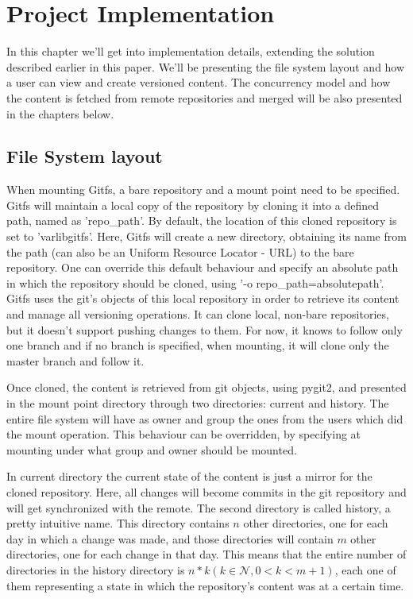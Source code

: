 \chapter{Project Implementation}

\label{ch:fslayout}

In this chapter we'll get into implementation details, extending the solution described earlier in this paper. We'll be presenting the file system layout and how a user can view and create versioned content. The concurrency model and how the content is fetched from remote repositories and merged will be also presented in the chapters below.

\section{File System layout}
When mounting Gitfs, a bare repository and a mount point need to be specified. Gitfs will maintain a local copy of the repository by cloning it into a defined path, named as 'repo\_path'. By default, the location of this cloned repository is set to '\/var\/lib\/gitfs'. Here, Gitfs will create a new directory, obtaining its name from the path (can also be an Uniform Resource Locator - URL) to the bare repository. One can override this default behaviour and specify an absolute path in which the repository should be cloned, using '-o repo\_path=\/absolute\/path\/'. Gitfs uses the git's objects of this local repository in order to retrieve its content and manage all versioning operations. It can clone local, non-bare repositories, but it doesn't support pushing changes to them. For now, it knows to follow only one branch and if no branch is specified, when mounting, it will clone only the master branch and follow it.

Once cloned, the content is retrieved from git objects, using pygit2, and presented in the mount point directory through two directories: current and history. The entire file system will have as owner and group the ones from the users which did the mount operation. This behaviour can be overridden, by specifying at mounting under what group and owner should be mounted. 

In current directory the current state of the content is just a mirror for the cloned repository. Here, all changes will become commits in the git repository and will get synchronized with the remote. The second directory is called history, a pretty intuitive name. This directory contains $n$ other directories, one for each day in which a change was made, and those directories will contain $m$ other directories, one for each change in that day. This means that the entire number of directories in the history directory is $n*k (k \in \mathcal{N}, 0<k<m+1)$, each one of them representing a state in which the repository's content was at a certain time.


